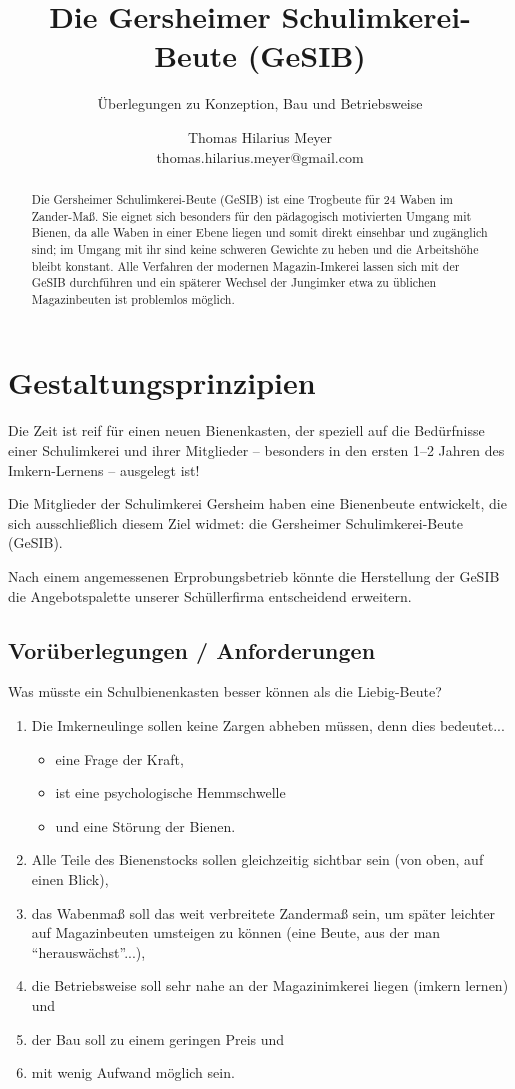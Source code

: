 \documentclass[12pt,a4paper,ngerman]{scrartcl}
\author{Thomas Hilarius Meyer\\ \textsf{thomas.hilarius.meyer@gmail.com}}
\title{Die Gersheimer Schulimkerei-Beute (GeSIB)}
\subtitle{Überlegungen zu Konzeption, Bau und Betriebsweise}
\begin{document}
	\maketitle

        
\begin{abstract}
	Die Gersheimer Schulimkerei-Beute (GeSIB) ist eine Trogbeute für 24 Waben im Zander-Maß.
	Sie eignet sich besonders für den pädagogisch motivierten Umgang mit Bienen, da alle Waben in einer
	Ebene liegen und somit direkt einsehbar und zugänglich sind; im Umgang mit ihr sind
	keine schweren Gewichte zu heben und die Arbeitshöhe bleibt konstant.
	Alle Verfahren der modernen Magazin-Imkerei lassen sich mit der GeSIB durchführen und
	ein späterer Wechsel der Jungimker etwa zu üblichen Magazinbeuten ist problemlos möglich.
\end{abstract}


\section{Gestaltungsprinzipien}

Die Zeit ist reif für einen neuen Bienenkasten, der speziell auf die Bedürfnisse einer Schulimkerei und ihrer Mitglieder --
besonders in den ersten 1--2 Jahren des Imkern-Lernens -- ausgelegt ist!

Die Mitglieder der Schulimkerei Gersheim haben eine Bienenbeute entwickelt, die sich ausschließlich diesem Ziel widmet:
die Gersheimer Schulimkerei-Beute (GeSIB).

Nach einem angemessenen Erprobungsbetrieb könnte die Herstellung der GeSIB die Angebotspalette unserer Schüllerfirma
entscheidend erweitern.


\subsection{Vorüberlegungen / Anforderungen}

Was müsste ein Schulbienenkasten besser können als die Liebig-Beute?

\begin{enumerate}
\item Die Imkerneulinge sollen keine Zargen abheben müssen, denn dies bedeutet...
  \begin{itemize}
  \item eine Frage der Kraft,
  \item ist eine psychologische Hemmschwelle
  \item  und eine Störung der Bienen.
  \end{itemize}
\item Alle Teile des Bienenstocks sollen gleichzeitig sichtbar sein (von oben, auf einen Blick),
\item das Wabenmaß soll das weit verbreitete Zandermaß sein,
  um später leichter auf Magazinbeuten umsteigen zu können (eine Beute, aus der man \enquote{herauswächst}...),
\item die Betriebsweise soll sehr nahe an der Magazinimkerei liegen (imkern lernen) und
\item der Bau soll zu einem geringen Preis und
\item mit wenig Aufwand möglich sein.
\end{enumerate}
\end{document}
